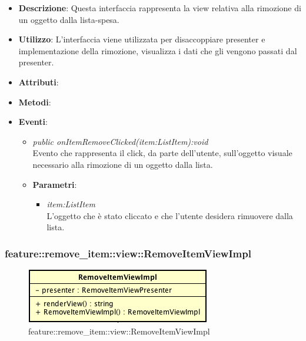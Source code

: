 \begin{itemize}
\item \textbf{Descrizione}: Questa interfaccia rappresenta la view relativa alla rimozione di un oggetto dalla lista-spesa.
\item \textbf{Utilizzo}: L'interfaccia viene utilizzata per disaccoppiare presenter e implementazione della rimozione, visualizza i dati che gli vengono passati dal presenter.
\item \textbf{Attributi}: 
\item \textbf{Metodi}:
\item \textbf{Eventi}:
	\begin{itemize}	
	\item \textit{public onItemRemoveClicked(item:ListItem):void}\\
	Evento che rappresenta il click, da parte dell'utente, sull'oggetto visuale necessario alla rimozione di un oggetto dalla lista.
			\item{\textbf{Parametri}: \begin{itemize}
			\item \textit{item:ListItem}\\
			L'oggetto che è stato cliccato e che l'utente desidera rimuovere dalla lista.
			\end{itemize}}
	\end{itemize}
\end{itemize}

\subsubsection{feature::remove\_item::view::RemoveItemViewImpl}

\label{feature::remove_item::view::RemoveItemViewImpl}
\begin{figure}[ht]
	\centering
	\includegraphics[scale=0.5]{Sezioni/SottosezioniST/img/app/RemoveItemViewImpl.png}
	\caption{feature::remove\_item::view::RemoveItemViewImpl}
\end{figure}

